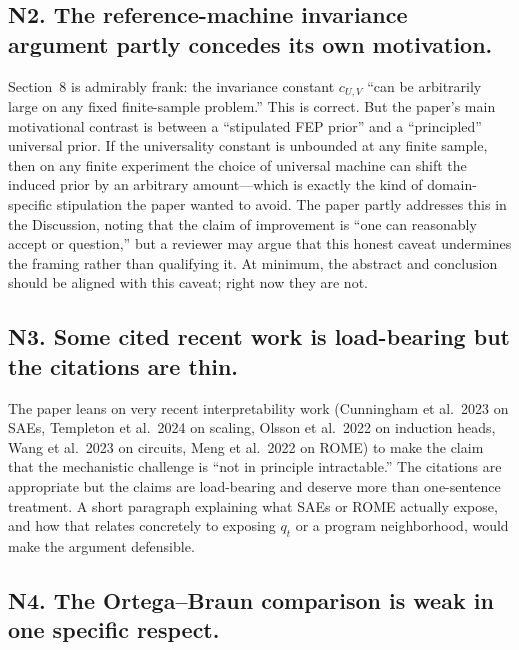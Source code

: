 \documentclass[11pt]{article}
\begin{document}
\subsection*{N2. The reference-machine invariance argument partly concedes its own motivation.}

Section~8 is admirably frank: the invariance constant $c_{U,V}$ ``can be arbitrarily large on any fixed finite-sample problem.'' This is correct. But the paper's main motivational contrast is between a ``stipulated FEP prior'' and a ``principled'' universal prior. If the universality constant is unbounded at any finite sample, then on any finite experiment the choice of universal machine can shift the induced prior by an arbitrary amount---which is exactly the kind of domain-specific stipulation the paper wanted to avoid. The paper partly addresses this in the Discussion, noting that the claim of improvement is ``one can reasonably accept or question,'' but a reviewer may argue that this honest caveat undermines the framing rather than qualifying it. At minimum, the abstract and conclusion should be aligned with this caveat; right now they are not.

\subsection*{N3. Some cited recent work is load-bearing but the citations are thin.}

The paper leans on very recent interpretability work (Cunningham et al.\ 2023 on SAEs, Templeton et al.\ 2024 on scaling, Olsson et al.\ 2022 on induction heads, Wang et al.\ 2023 on circuits, Meng et al.\ 2022 on ROME) to make the claim that the mechanistic challenge is ``not in principle intractable.'' The citations are appropriate but the claims are load-bearing and deserve more than one-sentence treatment. A short paragraph explaining what SAEs or ROME actually expose, and how that relates concretely to exposing $q_t$ or a program neighborhood, would make the argument defensible.

\subsection*{N4. The Ortega--Braun comparison is weak in one specific respect.}
\end{document}
